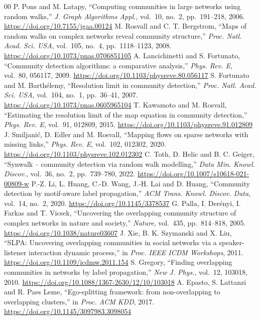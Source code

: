 \documentclass[conference]{IEEEtran}
\begin{document}
\begin{thebibliography}{00}
 P. Pons and M. Latapy, ``Computing communities in large networks using random walks,'' \emph{J. Graph Algorithms Appl.}, vol.~10, no.~2, pp.~191--218, 2006. \url{https://doi.org/10.7155/jgaa.00124}
 M. Rosvall and C. T. Bergstrom, ``Maps of random walks on complex networks reveal community structure,'' \emph{Proc. Natl. Acad. Sci. USA}, vol.~105, no.~4, pp.~1118--1123, 2008. \url{https://doi.org/10.1073/pnas.0706851105}
 A. Lancichinetti and S. Fortunato, ``Community detection algorithms: a comparative analysis,'' \emph{Phys. Rev. E}, vol.~80, 056117, 2009. \url{https://doi.org/10.1103/physreve.80.056117}
 S. Fortunato and M. Barth\'elemy, ``Resolution limit in community detection,'' \emph{Proc. Natl. Acad. Sci. USA}, vol.~104, no.~1, pp.~36--41, 2007. \url{https://doi.org/10.1073/pnas.0605965104}
 T. Kawamoto and M. Rosvall, ``Estimating the resolution limit of the map equation in community detection,'' \emph{Phys. Rev. E}, vol.~91, 012809, 2015. \url{https://doi.org/10.1103/physreve.91.012809}
 J. Smiljani\'c, D. Edler and M. Rosvall, ``Mapping flows on sparse networks with missing links,'' \emph{Phys. Rev. E}, vol.~102, 012302, 2020. \url{https://doi.org/10.1103/physreve.102.012302}
 C. Toth, D. Helic and B. C. Geiger, ``Synwalk -- community detection via random walk modelling,'' \emph{Data Min. Knowl. Discov.}, vol.~36, no.~2, pp.~739--780, 2022. \url{https://doi.org/10.1007/s10618-021-00809-w}
 P.-Z. Li, L. Huang, C.-D. Wang, J.-H. Lai and D. Huang, ``Community detection by motif-aware label propagation,'' \emph{ACM Trans. Knowl. Discov. Data}, vol.~14, no.~2, 2020. \url{https://doi.org/10.1145/3378537}
 G. Palla, I. Der\'enyi, I. Farkas and T. Vicsek, ``Uncovering the overlapping community structure of complex networks in nature and society,'' \emph{Nature}, vol.~435, pp.~814--818, 2005. \url{https://doi.org/10.1038/nature03607}
 J. Xie, B. K. Szymanski and X. Liu, ``SLPA: Uncovering overlapping communities in social networks via a speaker-listener interaction dynamic process,'' in \emph{Proc. IEEE ICDM Workshops}, 2011. \url{https://doi.org/10.1109/icdmw.2011.154}
 S. Gregory, ``Finding overlapping communities in networks by label propagation,'' \emph{New J. Phys.}, vol.~12, 103018, 2010. \url{https://doi.org/10.1088/1367-2630/12/10/103018}
 A. Epasto, S. Lattanzi and R. Paes Leme, ``Ego-splitting framework: from non-overlapping to overlapping clusters,'' in \emph{Proc. ACM KDD}, 2017. \url{https://doi.org/10.1145/3097983.3098054}

\end{thebibliography}
\end{document}

